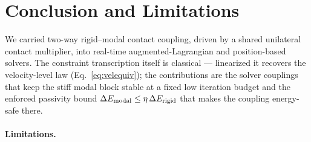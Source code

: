 \section{Conclusion and Limitations}
\label{sec:conclusion}

We carried two-way rigid--modal contact coupling, driven by a shared unilateral
contact multiplier, into real-time augmented-Lagrangian and position-based
solvers. The constraint transcription itself is classical --- linearized it
recovers the velocity-level law (Eq.~\ref{eq:velequiv}); the contributions are
the solver couplings that keep the stiff modal block stable at a fixed low
iteration budget and the enforced passivity bound $\Delta E_{\mathrm{modal}}\le\eta\,\Delta E_{\mathrm{rigid}}$ that
makes the coupling energy-safe there.

\paragraph*{Limitations.}
